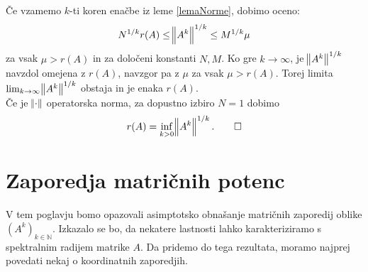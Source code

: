 \documentclass[mat1]{fmfdelo}
\newcommand{\N}{\mathbb N}
\begin{document}
\begin{dokaz}
    Če vzamemo $k$-ti koren enačbe iz leme \ref{lemaNorme}, dobimo oceno:
    \begin{equation*}
        N^{1/k} r(A) \leq \norm{A^k}^{1/k} \leq M^{1/k} \mu
    \end{equation*}
    za vsak $\mu > r(A)$ in za določeni konstanti $N, M$. Ko gre $k\rightarrow \infty$, je $\norm{A^k}^{1/k}$ navzdol omejena z $r(A)$, navzgor pa z $\mu$ za vsak $\mu > r(A)$. Torej limita $\lim_{k \rightarrow \infty} \norm{A^k}^{1/k}$ obstaja in je enaka $r(A)$. \\ Če je $\norm{\cdot}$ operatorska norma, za dopustno izbiro $N = 1$ dobimo
    \[r(A) = \inf_{k > 0} \norm{A^k}^{1/k}. \qedhere\]
\end{dokaz}


\section{Zaporedja matričnih potenc}
V tem poglavju bomo opazovali asimptotsko obnašanje matričnih zaporedij oblike $(A^k)_{k\in\N}$. Izkazalo se bo, da nekatere lastnosti lahko karakteriziramo s spektralnim radijem matrike $A$. Da pridemo do tega rezultata, moramo najprej povedati nekaj o koordinatnih zaporedjih.
\end{document}
